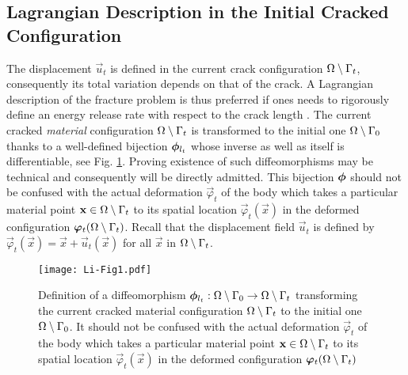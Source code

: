\subsection{Lagrangian Description in the Initial Cracked Configuration} \label{sec:initialconfiguration}
The displacement $\vec{u}_t$ is defined in the current crack configuration ${\Omega\setminus\Gamma_t}$, consequently its total variation depends on that of the crack. A Lagrangian description of the fracture problem is thus preferred if ones needs to rigorously define an energy release rate with respect to the crack length \cite{Destuynder:1981}. The current cracked \emph{material} configuration ${\Omega\setminus\Gamma_t}$ is transformed to the initial one ${\Omega\setminus\Gamma_0}$ thanks to a well-defined bijection $\philt_{l_t}$ whose inverse as well as itself is differentiable, see Fig. \ref{fig:philt}. Proving existence of such diffeomorphisms may be technical \cite{KhludnevSokolowskiSzulc:2010} and consequently will be directly admitted. This bijection $\philt$ should not be confused with the actual deformation $\vec{\varphi}_t$ of the body which takes a particular material point $\vec{x}\in\domaint$ to its spatial location $\vec{\varphi}_t(\vec{x})$ in the deformed configuration $\vec{\varphi}_t(\domaint)$. Recall that the displacement field $\vec{u}_t$ is defined by $\vec{\varphi}_t(\vec{x})=\vec{x}+\vec{u}_t(\vec{x})$ for all $\vec{x}$ in ${\Omega\setminus\Gamma_t}$.
\begin{figure}[htbp]
\centering
\texttt{[image: Li-Fig1.pdf]}
\caption{Definition of a diffeomorphism $\philt_{l_t}:\domaini\to\domaint$ transforming the current cracked material configuration ${\Omega\setminus\Gamma_t}$ to the initial one ${\Omega\setminus\Gamma_0}$. It should not be confused with the actual deformation $\vec{\varphi}_t$ of the body which takes a particular material point $\vec{x}\in\domaint$ to its spatial location $\vec{\varphi}_t(\vec{x})$ in the deformed configuration $\vec{\varphi}_t(\domaint)$} \label{fig:philt}
\end{figure}

